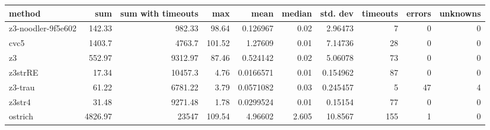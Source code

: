 \begin{tabular}{lrrrrrrrrr}
\hline
 method             &     sum &   sum with timeouts &    max &      mean &   median &   std. dev &   timeouts &   errors &   unknowns \\
\hline
 z3-noodler-9f5e602 &  142.33 &              982.33 &  98.64 & 0.126967  &    0.02  &   2.96473  &          7 &        0 &          0 \\
 cvc5               & 1403.7  &             4763.7  & 101.52 & 1.27609   &    0.01  &   7.14736  &         28 &        0 &          0 \\
 z3                 &  552.97 &             9312.97 &  87.46 & 0.524142  &    0.02  &   5.06078  &         73 &        0 &          0 \\
 z3strRE            &   17.34 &            10457.3  &   4.76 & 0.0166571 &    0.01  &   0.154962 &         87 &        0 &          0 \\
 z3-trau            &   61.22 &             6781.22 &   3.79 & 0.0571082 &    0.03  &   0.245457 &          5 &       47 &          4 \\
 z3str4             &   31.48 &             9271.48 &   1.78 & 0.0299524 &    0.01  &   0.15154  &         77 &        0 &          0 \\
 ostrich            & 4826.97 &            23547    & 109.54 & 4.96602   &    2.605 &  10.8567   &        155 &        1 &          0 \\
\hline
\end{tabular}
